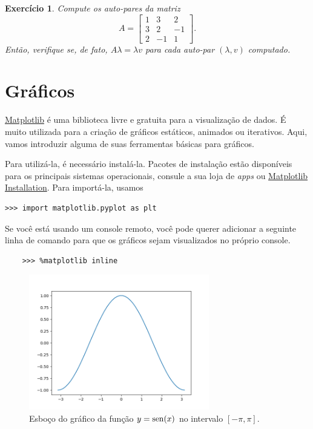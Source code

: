 \documentclass[12pt]{article}
\newtheorem{exr}{Exercício}[section]
\begin{document}
\begin{exr}
  Compute os auto-pares da matriz
  \begin{equation}
    A =
    \begin{bmatrix}
      1 & 3 & 2\\
      3 & 2 & -1\\
      2 & -1 & 1
    \end{bmatrix}.
  \end{equation}
  Então, verifique se, de fato, $A\lambda = \lambda v$ para cada auto-par $(\lambda, v)$ computado.
\end{exr}

\section{Gráficos}\label{sec_graf}

\href{https://matplotlib.org/}{Matplotlib} é uma biblioteca {\python} livre e gratuita para a visualização de dados. É muito utilizada para a criação de gráficos estáticos, animados ou iterativos. Aqui, vamos introduzir alguma de suas ferramentas básicas para gráficos.

Para utilizá-la, é necessário instalá-la. Pacotes de instalação estão disponíveis para os principais sistemas operacionais, consule a sua loja de {\it apps} ou \href{https://matplotlib.org/stable/users/installing.html}{Matplotlib Installation}. Para importá-la, usamos
\begin{lstlisting}
>>> import matplotlib.pyplot as plt
\end{lstlisting}

\begin{obs}
  Se você está usando um console {\python} remoto, você pode querer adicionar a seguinte linha de comando para que os gráficos sejam visualizados no próprio console.
  \begin{lstlisting}
    >>> %matplotlib inline
  \end{lstlisting}
\end{obs}

\begin{figure}[h]
  \centering
  \includegraphics[width=0.7\textwidth]{./data/sen}
  \caption{Esboço do gráfico da função $y=\operatorname{sen}(x)$ no intervalo $[-\pi,\pi]$.}
  \label{fig:sen}
\end{figure}
\end{document}
